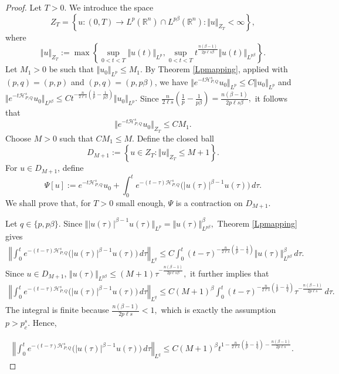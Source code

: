 \documentclass[12pt, reqno]{amsart}
\theoremstyle{definition}
\theoremstyle{remark}
\numberwithin{equation}{section}
\newcommand{\APQ}{\mathcal{H}_{P, Q}}
\begin{document}
\begin{proof}
Let $T>0$. We introduce the space
\[
    Z_T
    =
    \left\{
    u:(0,T)\to L^p(\mathbb R^n)\cap L^{p\beta}(\mathbb R^n):
    \Vert u\Vert_{Z_T}<\infty
    \right\},
\]
where
\[
    \Vert u\Vert_{Z_T}
    :=
    \max\left\{
    \sup_{0<t<T}\Vert u(t)\Vert_{L^p},
    \sup_{0<t<T}
    t^{\frac{n(\beta-1)}{2p\ell s\beta}}
    \Vert u(t)\Vert_{L^{p\beta}}
    \right\}.
\]
Let $M_1>0$ be such that $ \Vert u_0\Vert_{L^p} \leq M_1.$
By Theorem \ref{Lpmapping}, applied with $(p,q)=(p,p)$ and $(p,q)=(p,p\beta)$, we have $   \Vert e^{-t\APQ^s}u_0\Vert_{L^p}
    \leq
    C\Vert u_0\Vert_{L^p}$
and $ \Vert e^{-t\APQ^s}u_0\Vert_{L^{p\beta}}
    \leq
    C t^{-\frac{n}{2\ell s}\left(\frac1p-\frac1{p\beta}\right)}
    \Vert u_0\Vert_{L^p}.$
Since $ \frac{n}{2\ell s}\left(\frac1p-\frac1{p\beta}\right)
    =
    \frac{n(\beta-1)}{2p\ell s\beta},$
it follows that
\[
    \Vert e^{-t\APQ^s}u_0\Vert_{Z_T}
    \leq
    C M_1.
\]
Choose $M>0$ such that $C M_1\leq M.$
Define the closed ball
\[
    D_{M+1}
    :=
    \left\{
    u\in Z_T:
    \Vert u\Vert_{Z_T}\leq M+1
    \right\}.
\]
For $u\in D_{M+1}$, define
\[
    \Psi[u]
    :=
    e^{-t\APQ^s}u_0
    +
    \int_0^t
    e^{-(t-\tau)\APQ^s}
    \big(|u(\tau)|^{\beta-1}u(\tau)\big)\,d\tau.
\]
We shall prove that, for $T>0$ small enough, $\Psi$ is a contraction on $D_{M+1}$.

Let $q\in\{p,p\beta\}$. Since $\Vert |u(\tau)|^{\beta-1}u(\tau)\Vert_{L^p}
    =
    \Vert u(\tau)\Vert_{L^{p\beta}}^\beta,$
Theorem \ref{Lpmapping} gives
\[
\begin{aligned}
\left\Vert
\int_0^t
e^{-(t-\tau)\APQ^s}
\big(|u(\tau)|^{\beta-1}u(\tau)\big)\,d\tau
\right\Vert_{L^q}
\leq
C
\int_0^t
(t-\tau)^{-\frac{n}{2\ell s}\left(\frac1p-\frac1q\right)}
\Vert u(\tau)\Vert_{L^{p\beta}}^\beta
\,d\tau.
\end{aligned}
\]
Since $u\in D_{M+1}$, $\Vert u(\tau)\Vert_{L^{p\beta}}
    \leq
    (M+1)
    \tau^{-\frac{n(\beta-1)}{2p\ell s\beta}},$ it further implies that
\[
\begin{aligned}
\left\Vert
\int_0^t
e^{-(t-\tau)\APQ^s}
\big(|u(\tau)|^{\beta-1}u(\tau)\big)\,d\tau
\right\Vert_{L^q}
\leq
C(M+1)^\beta
\int_0^t
(t-\tau)^{-\frac{n}{2\ell s}\left(\frac1p-\frac1q\right)}
\tau^{-\frac{n(\beta-1)}{2p\ell s}}
\,d\tau.
\end{aligned}
\]
The integral is finite because $\frac{n(\beta-1)}{2p\ell s}<1,$
which is exactly the assumption $p>p_c^s$. Hence,

\begin{align} \label{lab5.2}
\left\Vert
\int_0^t
e^{-(t-\tau)\APQ^s}
\big(|u(\tau)|^{\beta-1}u(\tau)\big)\,d\tau
\right\Vert_{L^q}
\leq
C(M+1)^\beta
t^{
1-\frac{n}{2\ell s}\left(\frac1p-\frac1q\right)
-\frac{n(\beta-1)}{2p\ell s}
}.
\end{align}


\end{proof}
\end{document}
